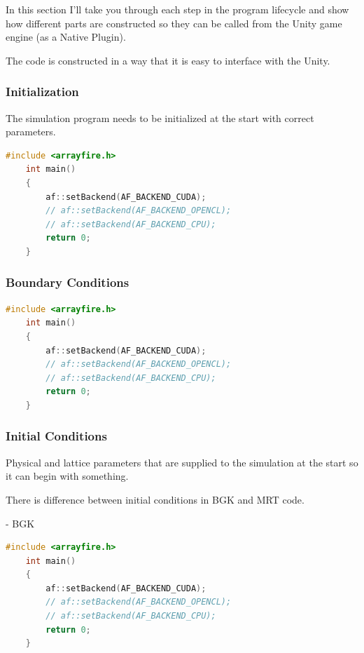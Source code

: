 In this section I'll take you through each step in the program lifecycle and show how different parts are constructed so they can be called from the Unity game engine (as a Native Plugin).

The code is constructed in a way that it is easy to interface with the Unity.

\subsubsection{Initialization}

The simulation program needs to be initialized at the start with correct parameters. 

\begin{lstlisting}[language=Cpp, caption=C++ code for setting different computing backends., label=cpp-backends]
	#include <arrayfire.h>
	int main()
	{
		af::setBackend(AF_BACKEND_CUDA);
		// af::setBackend(AF_BACKEND_OPENCL);
		// af::setBackend(AF_BACKEND_CPU);
		return 0;
	}
\end{lstlisting}


\subsubsection{Boundary Conditions}

\begin{lstlisting}[language=Cpp, caption=C++ code for setting different computing backends., label=cpp-backends]
	#include <arrayfire.h>
	int main()
	{
		af::setBackend(AF_BACKEND_CUDA);
		// af::setBackend(AF_BACKEND_OPENCL);
		// af::setBackend(AF_BACKEND_CPU);
		return 0;
	}
\end{lstlisting}

\subsubsection{Initial Conditions}

Physical and lattice parameters that are supplied to the simulation at the start so it can begin with something.

There is difference between initial conditions in BGK and MRT code.

- BGK \\

\begin{lstlisting}[language=Cpp, caption=C++ code for setting different computing backends., label=cpp-backends]
	#include <arrayfire.h>
	int main()
	{
		af::setBackend(AF_BACKEND_CUDA);
		// af::setBackend(AF_BACKEND_OPENCL);
		// af::setBackend(AF_BACKEND_CPU);
		return 0;
	}
\end{lstlisting}

